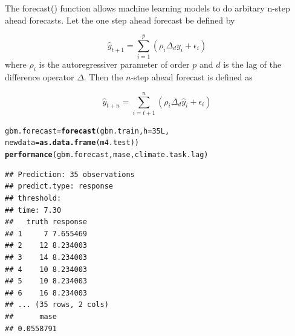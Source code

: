 \documentclass[12pt]{article}\usepackage[]{graphicx}\usepackage[]{color}
\makeatletter
\newcommand{\hlnum}[1]{\textcolor[rgb]{0.686,0.059,0.569}{#1}}%
\newcommand{\hlstd}[1]{\textcolor[rgb]{0.345,0.345,0.345}{#1}}%
\newcommand{\hlkwb}[1]{\textcolor[rgb]{0.69,0.353,0.396}{#1}}%
\newcommand{\hlkwc}[1]{\textcolor[rgb]{0.333,0.667,0.333}{#1}}%
\newcommand{\hlkwd}[1]{\textcolor[rgb]{0.737,0.353,0.396}{\textbf{#1}}}%
\newenvironment{kframe}{%
 \def\at@end@of@kframe{}%
 \ifinner\ifhmode%
  \def\at@end@of@kframe{\end{minipage}}%
  \begin{minipage}{\columnwidth}%
 \fi\fi%
 \def\FrameCommand##1{\hskip\@totalleftmargin \hskip-\fboxsep
 \colorbox{shadecolor}{##1}\hskip-\fboxsep
     \hskip-\linewidth \hskip-\@totalleftmargin \hskip\columnwidth}%
 \MakeFramed {\advance\hsize-\width
   \@totalleftmargin\z@ \linewidth\hsize
   \@setminipage}}%
 {\par\unskip\endMakeFramed%
 \at@end@of@kframe}
\newenvironment{knitrout}{}{} %
\theoremstyle{definition}
\newcommand\code{\@codex}
\def\@codex#1{{\normalfont\ttfamily\hyphenchar\font=-1 #1}}
\makeatother
\begin{document}
The \code{forecast()} function allows machine learning models to do arbitary n-step ahead forecasts. Let the one step ahead forecast be defined by

\begin{equation}
\hat{y}_{t+1} = \sum_{i=1}^p \left(\rho_i \Delta_d y_{i} + \epsilon_{i}\right)
\end{equation}
where $\rho_i$ is the autoregressiver parameter of order $p$ and $d$ is the lag of the difference operator $\Delta$. Then the $n$-step ahead forecast is defined as

\begin{equation}
\hat{y}_{t+n} = \sum_{i=t+1}^{n} \left(\rho_i \Delta_d \hat{y}_{i} + \epsilon_{i}\right)
\end{equation}


\singlespacing
\begin{knitrout}
\color{fgcolor}\begin{kframe}
\begin{alltt}
\hlstd{gbm.forecast} \hlkwb{=} \hlkwd{forecast}\hlstd{(gbm.train,} \hlkwc{h} \hlstd{=} \hlnum{35L}\hlstd{,}
                        \hlkwc{newdata} \hlstd{=} \hlkwd{as.data.frame}\hlstd{(m4.test))}
\hlkwd{performance}\hlstd{(gbm.forecast,mase,climate.task.lag)}
\end{alltt}
\end{kframe}
\end{knitrout}
\begin{knitrout}
\color{fgcolor}\begin{kframe}
\begin{verbatim}
## Prediction: 35 observations
## predict.type: response
## threshold: 
## time: 7.30
##   truth response
## 1     7 7.655469
## 2    12 8.234003
## 3    14 8.234003
## 4    10 8.234003
## 5    10 8.234003
## 6    16 8.234003
## ... (35 rows, 2 cols)
##      mase 
## 0.0558791
\end{verbatim}
\end{kframe}
\end{knitrout}

\doublespacing
\end{document}
